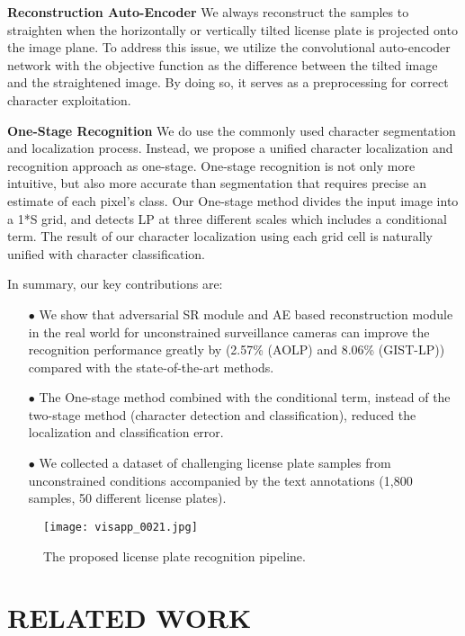 \documentclass[a4paper,twoside]{article}
\begin{document}
    \textbf{Reconstruction Auto-Encoder} We always reconstruct the samples to straighten when the horizontally or vertically tilted license plate is projected onto the image plane. To address this issue, we utilize the convolutional auto-encoder network with the objective function as the difference between the tilted image and the straightened image. By doing so, it serves as a preprocessing for correct character exploitation. 
    
    \textbf{One-Stage Recognition} We do use the commonly used character segmentation and localization process. Instead, we propose a unified character localization and recognition approach as one-stage. One-stage recognition is not only more intuitive, but also more accurate than segmentation that requires precise an estimate of each pixel's class. Our One-stage method divides the input image into a 1*S grid, and detects LP at three different scales which includes a conditional term. The result of our character localization using each grid cell is naturally unified with character classification. 

    
In summary, our key contributions are:
    \begin{itemize}
      \item[$\bullet$] We show that adversarial SR module and AE based reconstruction module in the real world for unconstrained surveillance cameras can improve the recognition performance greatly by (2.57\% (AOLP) and 8.06\% (GIST-LP)) compared with the state-of-the-art methods.
      \item[$\bullet$] The One-stage method combined with the conditional term, instead of the two-stage method (character detection and classification), reduced the localization and classification error.
      \item[$\bullet$] We collected a dataset of challenging license plate samples from unconstrained conditions accompanied by the text annotations (1,800 samples, 50 different license plates).
    \end{itemize}

\begin{figure*}[t]
    \begin{center}
\texttt{[image: visapp\_0021.jpg]}
    \end{center}
       \caption{The proposed license plate recognition pipeline.}
    \label{fig:long}
    \label{fig:onecol}
    \end{figure*}

\section{\uppercase{Related Work}}
\end{document}
